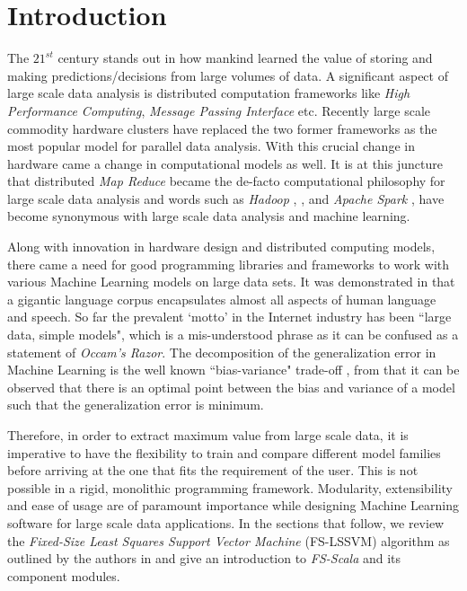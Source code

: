 \documentclass[conference, cmex10]{IEEEtran}
\begin{document}
\section{Introduction} \label{introduction}
The $21^{st}$ century stands out in how mankind learned the value of storing and making predictions/decisions from large volumes of data. A significant aspect of large scale data analysis is distributed computation frameworks like \textit{High Performance Computing}, \textit{Message Passing Interface} etc. Recently large scale commodity hardware clusters have replaced the two former frameworks as the most popular model for parallel data analysis. With this crucial change in hardware came a change in computational models as well. It is at this juncture that distributed \textit{Map Reduce} became the de-facto computational philosophy for large scale data analysis and  words such as \textit{Hadoop} \cite{Hadoop:2005}, \cite{chang2008bigtable}, \cite{Borthakur2011} and \textit{Apache Spark} \cite{Zaharia2010}, \cite{Spark:2010} have become synonymous with large scale data analysis and machine learning.

Along with innovation in hardware design and distributed computing models, there came a need for good programming libraries and frameworks to work with various Machine Learning models on large data sets. It was demonstrated in \cite{10.1109/MIS.2009.36} that a gigantic language corpus encapsulates almost all aspects of human language and speech. So far the prevalent `motto' in the Internet industry has been ``large data, simple models", which is a mis-understood phrase as it can be confused as a statement of \textit{Occam's Razor}. The decomposition of the generalization error in Machine Learning is the well known ``bias-variance" trade-off \cite{Valentini2004}, from that it can be observed that there is an optimal point between the bias and variance of a model such that the generalization error is minimum.

Therefore, in order to extract maximum value from large scale data, it is imperative to have the flexibility to train and compare different model families before arriving at the one that fits the requirement of the user. This is not possible in a rigid, monolithic programming framework. Modularity, extensibility and ease of usage are of paramount importance while designing Machine Learning software for large scale data applications. In the sections that follow, we review the \textit{Fixed-Size Least Squares Support Vector Machine} (FS-LSSVM) algorithm as outlined by the authors in \cite{DeBrabanter2010} and give an introduction to \textit{FS-Scala} and its component modules.
\end{document}
